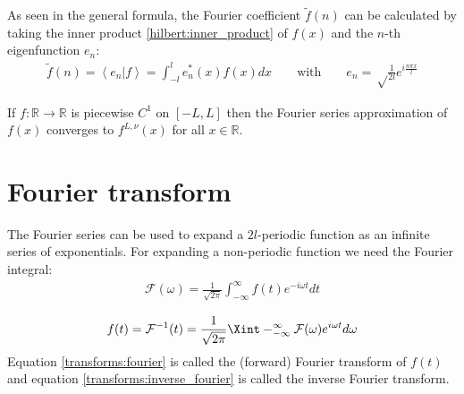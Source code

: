     \begin{formula}
		As seen in the general formula, the Fourier coefficient $\widetilde{f}(n)$ can be calculated by taking the inner product \ref{hilbert:inner_product} of $f(x)$ and the $n$-th eigenfunction $e_n$:
		\begin{gather}
			\label{transforms:fourier_coefficients}
        		\widetilde{f}(n) = \left\langle e_n|f\right\rangle = \int_{-l}^le_n^*(x)f(x)dx \qquad\text{with}\qquad e_n = \sqrt\frac{1}{2l}e^{i\frac{n\pi x}{l}}
		\end{gather}
	\end{formula}
    
    \begin{theorem}
    	If $f:\mathbb{R}\rightarrow\mathbb{R}$ is piecewise $C^1$ on $[-L, L]$ then the Fourier series approximation of $f(x)$ converges to $f^{L, \nu}(x)$ for all $x\in\mathbb{R}$.
    \end{theorem}

\section{Fourier transform}
	
	The Fourier series can be used to expand a $2l$-periodic function as an infinite series of exponentials. For expanding a non-periodic function we need the Fourier integral: 
	\begin{gather}
		\label{transforms:fourier}
	        \boxed{\mathcal{F}(\omega) = \frac{1}{\sqrt{2\pi}} \int_{-\infty}^{\infty}f(t)e^{-i\omega t}dt}
	\end{gather}
    
	\begin{gather}
		\label{transforms:inverse_fourier}
	        f(t) = \mathcal{F}^{-1}(t) = \frac{1}{\sqrt{2\pi}} \Xint-_{-\infty}^{\infty}\mathcal{F}(\omega)e^{i\omega t}d\omega
	\end{gather}
	Equation \ref{transforms:fourier} is called the (forward) Fourier transform of $f(t)$ and equation \ref{transforms:inverse_fourier} is called the inverse Fourier transform.
    
